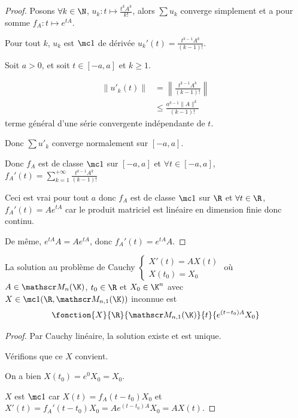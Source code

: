 \begin{proof}
    Posons $\forall k \in \N$, $u_k: t \mapsto \frac{t^k A^k}{k!}$, alors 
    $\sum u_k$ converge simplement et a pour somme $f_A : t \mapsto e^{tA}$.

    Pour tout $k$, $u_k$ est $\mc 1$ de dérivée $u_k'(t) = \frac{t^{k - 1} A^k}{(k - 1)!}$.

    Soit $a > 0$, et soit $t \in [-a, a]$ et $k \geqslant 1$. 

    \begin{align}
        \| u'_k(t) \| & = \left\| \frac{t^{k - 1} A^k}{(k - 1)!} \right\| \\
        & \leqslant \frac{a^{k - 1} \| A \|^k}{(k - 1)!}
    \end{align}
    terme général d'une série convergente indépendante de $t$. 

    Donc $\sum u'_k$ converge normalement sur $[-a, a]$.

    Donc $f_A$ est de classe $\mc 1$ sur $[-a, a]$ et $\forall t \in [-a, a]$, $f_A'(t) = \sum_{k = 1}^{+ \infty} \frac{t^{k - 1} A^k}{(k - 1)!}$

    Ceci est vrai pour tout $a$ donc $f_A$ est de classe $\mc 1$ sur $\R$ et $\forall t \in \R$, 
    $f_A'(t) = A e^{tA}$ car le produit matriciel est linéaire en dimension finie donc continu. 

    De même, $e^{tA} A = A e^{tA}$, donc $f_A'(t) = e^{tA} A$.
\end{proof}

\begin{theoreme}{}{}
    La solution au problème de Cauchy $\begin{cases}
    X'(t) = A X(t) \\
    X(t_0) = X_0
    \end{cases}$ où $A \in \mathscr M_n(\K)$, $t_0 \in \R$ et $X_0 \in \K^n$ avec $X \in \mc 1 (\R, \mathscr M_{n, 1}(\K))$ inconnue
    est $$\fonction{X}{\R}{\mathscr M_{n, 1}(\K)}{t}{e^{(t - t_0) A} X_0}$$
\end{theoreme}

\begin{proof}
    Par Cauchy linéaire, la solution existe et est unique. 

    Vérifions que ce $X$ convient. 

    On a bien $X(t_0) = e^0 X_0 = X_0$.

    $X$ est $\mc 1$ car $X(t) = f_A(t - t_0) X_0$ et $X'(t) = f_A'(t - t_0) X_0 = A e^{(t - t_0) A} X_0 = A X(t)$.
\end{proof}


